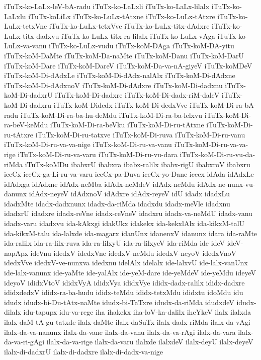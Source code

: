 {iTuTx-ko-LaLx-leV-bA-radu
iTuTx-ko-LaLxli
iTuTx-ko-LaLx-lilalx
iTuTx-ko-LaLxlu
iTuTx-koLiLx
iTuTx-ko-LuLx-tAtxne
iTuTx-ko-LuLx-tAtxre
iTuTx-ko-LuLx-tetxVne
iTuTx-ko-LuLx-tetxVve
iTuTx-ko-LuLx-titx-dAdxre
iTuTx-ko-LuLx-titx-dadxvu
iTuTx-ko-LuLx-titx-ra-lilalx
iTuTx-ko-LuLx-vAga
iTuTx-ko-LuLx-va-vanu
iTuTx-ko-LuLx-vudu
iTuTx-koM-DAga
iTuTx-koM-DA-yitu
iTuTx-koM-DaMte
iTuTx-koM-Da-naMte
iTuTx-koM-Danu
iTuTx-koM-DarU
iTuTx-koM-Dare
iTuTx-koM-DareV
iTuTx-koM-Da-va-nA-giyeV
iTuTx-koMDeV
iTuTx-koM-Di-dAdxLe
iTuTx-koM-Di-dAdx-nalAlx
iTuTx-koM-Di-dAdxne
iTuTx-koM-Di-dAdxnoV
iTuTx-koM-Di-dAdxre
iTuTx-koM-Di-dadxnu
iTuTx-koM-Di-dadxrU
iTuTx-koM-Di-dadxre
iTuTx-koM-Di-dadx-riM-daleV
iTuTx-koM-Di-dadxru
iTuTx-koM-Didedx
iTuTx-koM-Di-dedxVve
iTuTx-koM-Di-ra-bA-radu
iTuTx-koM-Di-ra-ba-hu-deMdu
iTuTx-koM-Di-ra-ba-lelxvu
iTuTx-koM-Di-ra-beV-keMdu
iTuTx-koM-Di-ra-beVku
iTuTx-koM-Di-ru-tAtxne
iTuTx-koM-Di-ru-tAtxre
iTuTx-koM-Di-ru-tatxve
iTuTx-koM-Di-ruva
iTuTx-koM-Di-ru-vanu
iTuTx-koM-Di-ru-va-va-nige
iTuTx-koM-Di-ru-va-vanu
iTuTx-koM-Di-ru-va-va-rige
iTuTx-koM-Di-ru-va-varu
iTuTx-koM-Di-ru-vu-dara
iTuTx-koM-Di-ru-vu-da-riMda
iTuTx-koMDu
ibabxrU
ibabxra
ibabx-ralilx
ibabx-rigU
ibabxroV
ibabxru
iceCx
iceCx-ga-Li-ru-va-varu
iceCx-pa-Duva
iceCx-yo-Dane
icecx
idAda
idAdxLe
idAdxga
idAdxne
idAdx-neMba
idAdx-neMdeV
idAdx-neMdu
idAdx-ne-nunx-vu-danunx
idAdx-neyeV
idAdxnoV
idAdxre
idAdx-reyeV
idU
idadx
idadxLu
idadxMte
idadx-dadxnunx
idadx-da-riMda
idadxdu
idadx-meVle
idadxnu
idadxrU
idadxre
idadx-reVne
idadx-reVneV
idadxru
idadx-va-neMdU
idadx-vanu
idadx-varu
idadxvu
ida-kAkxgi
idakUkx
idakekx
ida-kekxlAlx
ida-kikxM-talU
ida-kikxM-talu
ida-lalxde
ida-magarx
idanUnx
idanenxV
idanunx
idara
ida-raMte
ida-ralilx
ida-ra-lilx-ruva
ida-ra-lilxyU
ida-ra-lilxyeV
ida-riMda
ide
ideV
ideV-napApx
ideVnu
idedxV
idedxVne
idedxV-neMdu
idedxV-neyoV
idedxVnoV
idedxVve
idedxV-ve-nunxva
idedxnu
idelAlx
idelalx
ide-lalxvU
ide-lalx-vanUnx
ide-lalx-vanunx
ide-yaMte
ide-yalAlx
ide-yeM-dare
ide-yeMdeV
ide-yeMdu
ideyeV
ideyoV
ididxVtoV
ididxVyA
ididxVya
ididxVye
ididx-dadx-ralilx
ididx-dadxre
ididxdedxV
ididx-ra-ba-hudu
ididx-teMdu
ididx-tetxMdu
ididxtu
idoMdu
idu
idudx
idudx-bi-Du-tAtx-naMte
idudx-bi-TaTxre
idudx-da-riMda
idudxdeV
idudx-dilalx
idu-tapupx
idu-va-rege
iha
ihakekx
iha-loV-ka-dalilx
iheYkeV
ilalx
ilalxda
ilalx-daM-tA-gu-tatxde
ilalx-daMte
ilalx-daSuTx
ilalx-dadx-riMda
ilalx-da-vAgi
ilalx-da-va-nanunx
ilalx-da-vane
ilalx-da-vanu
ilalx-da-va-rAgi
ilalx-da-vara
ilalx-da-va-ri-gAgi
ilalx-da-va-rige
ilalx-da-varu
ilalxde
ilalxdeV
ilalx-deyU
ilalx-deyeV
ilalx-di-dadxrU
ilalx-di-dadxre
ilalx-di-dadx-va-nige
}

